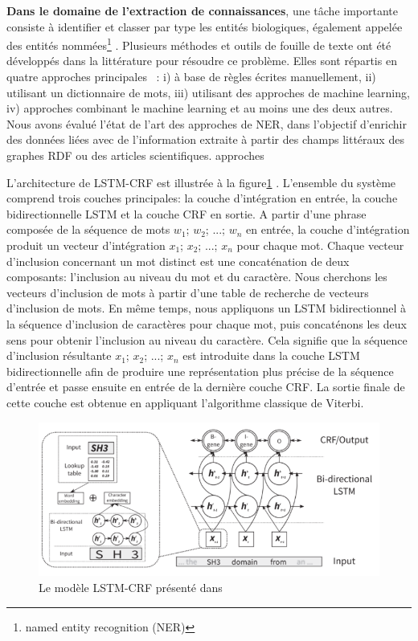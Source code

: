 \textbf{Dans le domaine de l’extraction de connaissances}, une tâche importante consiste à identifier et classer par type les entités biologiques, également appelée des entités nommées\footnote{named entity recognition (NER)} . Plusieurs méthodes et outils de fouille de texte ont été développés dans la littérature pour résoudre ce problème. Elles sont répartis en quatre approches principales~\cite{Basaldella2017} : i) à base de règles écrites manuellement, ii) utilisant un dictionnaire de mots, iii) utilisant des approches de machine learning, iv) approches combinant le machine learning et au moins une des deux autres. Nous avons évalué l’état de l’art des approches de NER, dans l'objectif d’enrichir des données liées avec de l'information extraite à partir des champs littéraux des graphes RDF ou des articles scientifiques.  approches 

L'architecture de LSTM-CRF est illustrée à la figure\ref{LSTMCRF} \cite{Habibi2017a}. L'ensemble du système comprend trois couches principales: la couche d'intégration en entrée, la couche bidirectionnelle LSTM et la couche CRF en sortie. A partir d'une phrase composée de la séquence de mots $ w_ {1} $; $ w_ {2} $; ...; $ w_ {n} $ en entrée, la couche d'intégration produit un vecteur d'intégration $ x_ {1} $; $ x_ {2} $; ...; $ x_ {n} $ pour chaque mot. Chaque vecteur d'inclusion concernant un mot distinct est une concaténation de deux composants: l'inclusion au niveau du mot et du caractère. Nous cherchons les vecteurs d'inclusion de mots à partir d’une table de recherche de vecteurs d'inclusion de mots. En même temps, nous appliquons un LSTM bidirectionnel à la séquence d'inclusion de caractères pour chaque mot, puis concaténons les deux sens pour obtenir l'inclusion au niveau du caractère. Cela signifie que la séquence d'inclusion résultante  $ x_ {1} $; $ x_ {2} $; ...; $ x_ {n} $ est introduite dans la couche LSTM bidirectionnelle afin de produire une représentation plus précise de la séquence d'entrée et passe ensuite en entrée de la dernière couche CRF. La sortie finale de cette couche est obtenue en appliquant l'algorithme classique de Viterbi. 

\begin{figure}[!ht]
\begin{center}
	\includegraphics[width=1\textwidth]{Figures/LSTMCRF.png}
\end{center}
\caption{\label{LSTMCRF} Le modèle LSTM-CRF présenté dans \cite{Habibi2017a}}
\end{figure}


